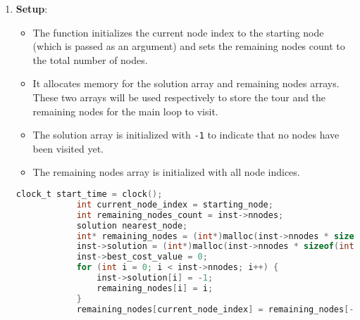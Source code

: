 \documentclass{article}
\begin{document}
\begin{enumerate} 
	\item \textbf{Setup}:
	      \begin{itemize}
		      \item The function initializes the current node index to the starting node (which is passed as an argument) 
			  and sets the remaining nodes count to the total number of nodes.
		      \item It allocates memory for the solution array and remaining nodes arrays. These two arrays will be used respectively to store the tour and the remaining nodes for the main loop to visit.
		      \item The solution array is initialized with \texttt{-1} to indicate that no nodes have been visited yet.
		      \item The remaining nodes array is initialized with all node indices.
	      \end{itemize}

		\begin{lstlisting}[language=C]
			clock_t start_time = clock();
			int current_node_index = starting_node;
			int remaining_nodes_count = inst->nnodes;
			solution nearest_node;
			int* remaining_nodes = (int*)malloc(inst->nnodes * sizeof(int));
			inst->solution = (int*)malloc(inst->nnodes * sizeof(int));
			inst->best_cost_value = 0;
			for (int i = 0; i < inst->nnodes; i++) {
				inst->solution[i] = -1;
				remaining_nodes[i] = i;
			}
			remaining_nodes[current_node_index] = remaining_nodes[--remaining_nodes_count];
		\end{lstlisting}


\end{enumerate}
\end{document}
